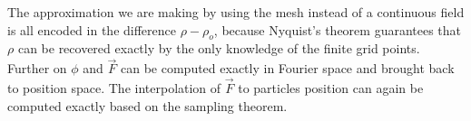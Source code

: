 The approximation we are making by using the mesh instead of
a continuous field is all encoded in the difference 
$\rho-\rho_o$, because
Nyquist's theorem guarantees that $\rho$ can
be recovered exactly by the only knowledge
of the finite grid points. 
Further on $\phi$ and $\vec F$ can be computed exactly
in Fourier space and brought back to position space.
The interpolation of $\vec F$ to particles position
can again be computed exactly based on the sampling theorem.

